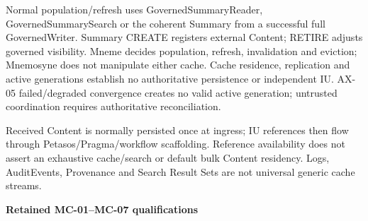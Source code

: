 Normal population/refresh uses GovernedSummaryReader, GovernedSummarySearch or the coherent Summary from a successful full GovernedWriter. Summary CREATE registers external Content; RETIRE adjusts governed visibility. Mneme decides population, refresh, invalidation and eviction; Mnemosyne does not manipulate either cache. Cache residence, replication and active generations establish no authoritative persistence or independent IU. AX-05 failed/degraded convergence creates no valid active generation; untrusted coordination requires authoritative reconciliation.



Received Content is normally persisted once at ingress; IU references then flow through Petasos/Pragma/workflow scaffolding. Reference availability does not assert an exhaustive cache/search or default bulk Content residency. Logs, AuditEvents, Provenance and Search Result Sets are not universal generic cache streams.



\par\medskip\textbf{Retained MC-01–MC-07 qualifications}\par


